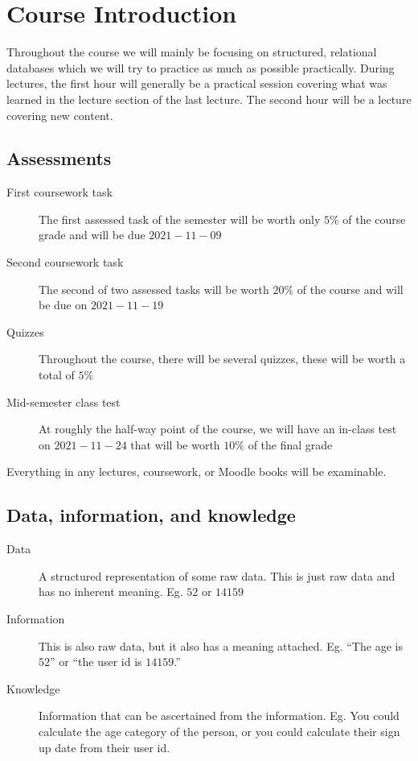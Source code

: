 \section{Course Introduction}\label{sec:dsr_course_introduction}

Throughout the course we will mainly be focusing on structured, relational databases which we will try to practice as much as possible practically.
During lectures, the first hour will generally be a practical session covering what was learned in the lecture section of the last lecture.
The second hour will be a lecture covering new content.

\subsection{Assessments}\label{sub:dsr_assessments}

\begin{description}
    \item[First coursework task] The first assessed task of the semester will be worth only \(5\%\) of the course grade and will be due \(2021-11-09\)
    \item[Second coursework task] The second of two assessed tasks will be worth \(20\%\) of the course and will be due on \(2021-11-19\)
    \item[Quizzes] Throughout the course, there will be several quizzes, these will be worth a total of \(5\%\)
         \item[Mid-semester class test] At roughly the half-way point of the course, we will have an in-class test on \(2021-11-24\) that will be worth \(10\%\) of the final grade
\end{description}

\begin{note}
    Everything in any lectures, coursework, or Moodle books will be examinable.
\end{note}

\subsection{Data, information, and knowledge}\label{sub:data_information_and_knowledge}

\begin{description}
    \item[Data] A structured representation of some raw data.
        This is just raw data and has no inherent meaning.
        Eg. \(52\) or \(14159\)
         \item[Information] This is also raw data, but it also has a meaning attached.
             Eg. ``The age is \(52\)'' or ``the user id is \(14159\).''
 \item[Knowledge] Information that can be ascertained from the information.
Eg. You could calculate the age category of the person, or you could calculate their sign up date from their user id.
\end{description}

